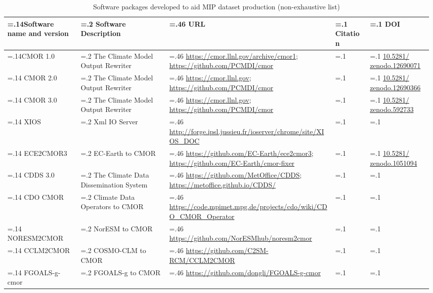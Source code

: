 \documentclass[manuscript]{copernicus}
\begin{document}
\begin{table}[htp]
\renewcommand{\arraystretch}{2}
\scriptsize
\centering
\caption{Software packages developed to aid MIP dataset production (non-exhaustive list)}
\resizebox{\textwidth}{!} {
	\begin{tabularx}{0.9\textwidth} { 
	  | >{\raggedright\arraybackslash\hsize=.14\hsize}X
	  | >{\centering\arraybackslash\hsize=.2\hsize}X
	  | >{\centering\arraybackslash\hsize=.46\hsize}X
	  | >{\centering\arraybackslash\hsize=.1\hsize}X
	  | >{\centering\arraybackslash\hsize=.1\hsize}X | }
\hline
\textbf{Software name and version} & \textbf{Software Description} & \textbf{URL} & \textbf{Citation} & \textbf{DOI}\\ \hline
CMOR 1.0 & The Climate Model Output Rewriter & \url{https://cmor.llnl.gov/archive/cmor1}; \url{https://github.com/PCMDI/cmor} & \citet{taylor_cmor_2006} & \href{http://doi.org/10.5281/zenodo.12690071}{10.5281/ zenodo.12690071}\\ \hline
CMOR 2.0 & The Climate Model Output Rewriter & \url{https://cmor.llnl.gov}; \url{https://github.com/PCMDI/cmor} & \citet{doutriaux_cmor_2011} & \href{http://doi.org/10.5281/zenodo.12690366}{10.5281/ zenodo.12690366}\\ \hline
CMOR 3.0 & The Climate Model Output Rewriter & \url{https://cmor.llnl.gov}; \url{https://github.com/PCMDI/cmor} & \citet{doutriaux_cmor_2024} & \href{http://doi.org/10.5281/zenodo.592733}{10.5281/ zenodo.592733}\\ \hline
XIOS & Xml IO Server & \url{http://forge.ipsl.jussieu.fr/ioserver/chrome/site/XIOS\_DOC} & &\\ \hline
ECE2CMOR3 & EC-Earth to CMOR & \url{https://github.com/EC-Earth/ece2cmor3}; \url{https://github.com/EC-Earth/cmor-fixer} & & \href{http://doi.org/10.5281/zenodo.1051094}{10.5281/ zenodo.1051094}\\ \hline
CDDS 3.0 & The Climate Data Dissemination System & \url{https://github.com/MetOffice/CDDS}; \url{https://metoffice.github.io/CDDS/} & &\\ \hline
CDO CMOR & Climate Data Operators to CMOR & \url{https://code.mpimet.mpg.de/projects/cdo/wiki/CDO\_CMOR\_Operator} & &\\ \hline
NORESM2CMOR & NorESM to CMOR & \url{https://github.com/NorESMhub/noresm2cmor} & &\\ \hline
CCLM2CMOR & COSMO-CLM to CMOR & \url{https://github.com/C2SM-RCM/CCLM2CMOR} & &\\ \hline
FGOALS-g-cmor & FGOALS-g to CMOR & \url{https://github.com/dongli/FGOALS-g-cmor} & &\\ \hline

\end{tabularx}}
\end{table}
\end{document}
